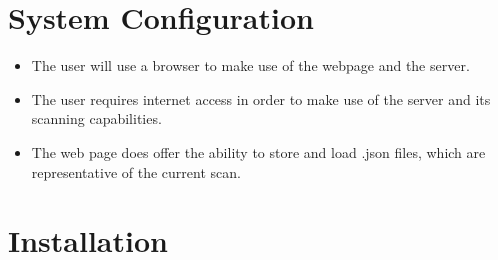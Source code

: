 \documentclass[hidelinks,a4paper,12pt]{article}
\begin{document}
\section{System Configuration}
\begin {itemize}
	\item The user will use a browser to make use of the webpage and the server.
	\item The user requires internet access in order to make use of the server and its scanning capabilities. 
	\item The web page does offer the ability to store and load .json files, which are representative of the current scan.
\end{itemize}


\newpage

\section{Installation}
\end{document}

